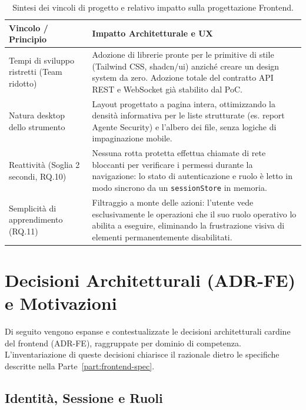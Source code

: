 \documentclass[11pt,a4paper]{article}
\begin{document}
\begin{table}[H]
\centering
\caption{Sintesi dei vincoli di progetto e relativo impatto sulla progettazione Frontend.}
\label{tab:fe-vincoli-impatto}
\vspace{2mm}
\renewcommand{\arraystretch}{1.2}
\begin{tabularx}{\textwidth}{|X|X|}
\hline
\textbf{Vincolo / Principio} & \textbf{Impatto Architetturale e UX} \\ \hline
Tempi di sviluppo ristretti (Team ridotto) & Adozione di librerie pronte per le primitive di stile (Tailwind CSS, shadcn/ui) anziché creare un design system da zero. Adozione totale del contratto API REST e WebSocket già stabilito dal PoC. \\ \hline
Natura desktop dello strumento & Layout progettato a pagina intera, ottimizzando la densità informativa per le liste strutturate (es. report Agente Security) e l'albero dei file, senza logiche di impaginazione mobile. \\ \hline
Reattività (Soglia 2 secondi, RQ.10) & Nessuna rotta protetta effettua chiamate di rete bloccanti per verificare i permessi durante la navigazione: lo stato di autenticazione e ruolo è letto in modo sincrono da un \texttt{sessionStore} in memoria. \\ \hline
Semplicità di apprendimento (RQ.11) & Filtraggio a monte delle azioni: l'utente vede esclusivamente le operazioni che il suo ruolo operativo lo abilita a eseguire, eliminando la frustrazione visiva di elementi permanentemente disabilitati. \\ \hline
\end{tabularx}
\end{table}

\section{Decisioni Architetturali (ADR-FE) e Motivazioni}
\label{sec:fe-adr}

Di seguito vengono espanse e contestualizzate le decisioni architetturali cardine del frontend (ADR-FE), raggruppate per dominio di competenza. L'inventariazione di queste decisioni chiarisce il razionale dietro le specifiche descritte nella Parte~\ref{part:frontend-spec}.

\subsection{Identità, Sessione e Ruoli}
\end{document}
